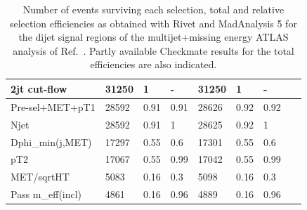 \documentclass[11pt]{cernrep}
\begin{document}
\begin{table}[b!]
\begin{tabular}{ | l || l | l | l || l | l | l || l | }
\hline
{\bf 2jt cut-flow} & 31250 & 1 & - & 31250 & 1 & - & \   \\ \hline
Pre-sel+MET+pT1   & 28592 & 0.91 & 0.91 & 28626 & 0.92 & 0.92 & \   \\ \hline
Njet              & 28592 & 0.91 & 1 & 28625 & 0.92 & 1 & \   \\ \hline
Dphi\_min(j,MET)   & 17297 & 0.55 & 0.6 & 17301 & 0.55 & 0.6 & \   \\ \hline
pT2               & 17067 & 0.55 & 0.99 & 17042 & 0.55 & 0.99 & \   \\ \hline
MET/sqrtHT        & 5083 & 0.16 & 0.3 & 5098 & 0.16 & 0.3 & \   \\ \hline
Pass m\_eff(incl)  & 4861 & 0.16 & 0.96 & 4889 & 0.16 & 0.96 & \   \\ \hline
		\end{tabular}
 \caption{Number of events surviving each selection, total and relative
  selection efficiencies as obtained with Rivet and MadAnalysis 5 for the dijet
  signal regions of the multijet+missing energy ATLAS analysis of
  Ref.~\cite{Aaboud:2016zdn}. Partly available Checkmate results for the total
  efficiencies are also indicated.}
	\label{tab:1605.03814-2j}
\end{table}
\end{document}
